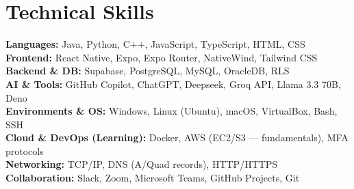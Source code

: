 \documentclass[letterpaper,11pt]{article}
\begin{document}
\section{Technical Skills}
\begin{itemize}[leftmargin=0.15in, label={}, noitemsep, nolistsep, topsep=0pt]
\vspace{4pt}
    \small{\item{
     \textbf{Languages:} Java, Python, C++, JavaScript, TypeScript, HTML, CSS \\
     \textbf{Frontend:} React Native, Expo, Expo Router, NativeWind, Tailwind CSS \\
     \textbf{Backend \& DB:} Supabase, PostgreSQL, MySQL, OracleDB, RLS \\
     \textbf{AI \& Tools:} GitHub Copilot, ChatGPT, Deepseek, Groq API, Llama 3.3 70B, Deno \\
     \textbf{Environments \& OS:} Windows, Linux (Ubuntu), macOS, VirtualBox, Bash, SSH \\
     \textbf{Cloud \& DevOps (Learning):} Docker, AWS (EC2/S3 — fundamentals), MFA protocols \\
     \textbf{Networking:} TCP/IP, DNS (A/Quad records), HTTP/HTTPS \\
     \textbf{Collaboration:} Slack, Zoom, Microsoft Teams, GitHub Projects, Git \\
    }}
\end{itemize}
\end{document}
